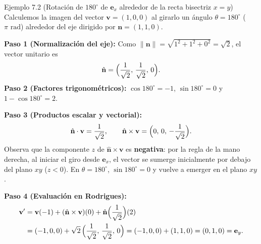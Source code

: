 \documentclass[11pt,letterpaper]{article}
\begin{document}
\begin{examplebox}{Ejemplo 7.2 (Rotación de $180^\circ$ de $\mathbf{e}_x$ alrededor de la recta bisectriz $x=y$)}
Calculemos la imagen del vector $\mathbf{v}=(1,0,0)$ al girarlo un ángulo $\theta=180^\circ$ ($\pi\text{ rad}$) alrededor del eje dirigido por $\mathbf{n}=(1,1,0)$.

\medskip\noindent
\textbf{Paso 1 (Normalización del eje):} Como $\|\mathbf{n}\|=\sqrt{1^2+1^2+0^2}=\sqrt{2}$, el vector unitario es
\[
  \hat{\mathbf{n}} = \Bigl(\frac{1}{\sqrt{2}},\,\frac{1}{\sqrt{2}},\,0\Bigr).
\]
\textbf{Paso 2 (Factores trigonométricos):} $\cos 180^\circ = -1$, $\sin 180^\circ = 0$ y $1-\cos 180^\circ = 2$.

\medskip\noindent
\textbf{Paso 3 (Productos escalar y vectorial):}
\[
  \hat{\mathbf{n}}\cdot\mathbf{v} = \frac{1}{\sqrt{2}}, \qquad
  \hat{\mathbf{n}}\times\mathbf{v} = \Bigl(0,\,0,\,-\frac{1}{\sqrt{2}}\Bigr).
\]
Observa que la componente $z$ de $\hat{\mathbf{n}}\times\mathbf{v}$ es \textbf{negativa}: por la regla de la mano derecha, al iniciar el giro desde $\mathbf{e}_x$, el vector se sumerge inicialmente por debajo del plano $xy$ ($z<0$). En $\theta=180^\circ$, $\sin 180^\circ=0$ y vuelve a emerger en el plano $xy$.

\medskip\noindent
\textbf{Paso 4 (Evaluación en Rodrigues):}
\begin{align*}
  \mathbf{v}' &= \mathbf{v}(-1) + (\hat{\mathbf{n}}\times\mathbf{v})(0) + \hat{\mathbf{n}}\Bigl(\frac{1}{\sqrt{2}}\Bigr)(2) \\
              &= (-1,0,0) + \sqrt{2}\,\Bigl(\frac{1}{\sqrt{2}},\,\frac{1}{\sqrt{2}},\,0\Bigr) = (-1,0,0) + (1,1,0) = (0,1,0) = \mathbf{e}_y.
\end{align*}
\end{examplebox}
\end{document}
